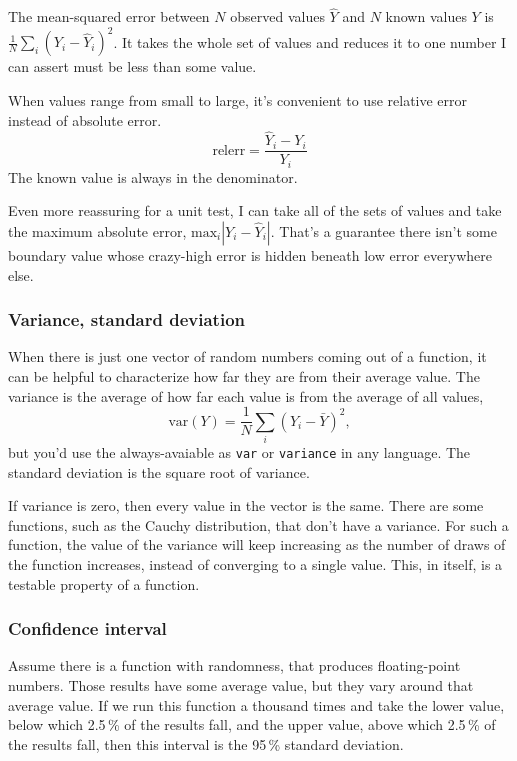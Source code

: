 \documentclass[fleqn,10pt]{olplainarticle}
\begin{document}
The mean-squared error between $N$ observed values $\hat{Y}$ and $N$ known values $Y$ is $\frac{1}{N}\sum_i (Y_i - \hat{Y}_i)^2$.
It takes the whole set of values and reduces it to one number I can assert must be less than some value.

When values range from small to large, it's convenient to use
relative error instead of absolute error.
\begin{equation}
  \mbox{relerr} = \frac{\hat{Y}_i - Y_i}{Y_i}
\end{equation}
The known value is always in the denominator.

Even more reassuring for a unit test, I can take all of the
sets of values and take the maximum absolute error,
$\mbox{max}_i |Y_i-\hat{Y}_i|$. That's a guarantee there isn't
some boundary value whose crazy-high error is hidden beneath
low error everywhere else.

\subsubsection{Variance, standard deviation}
When there is just one vector of random numbers coming out
of a function, it can be helpful to characterize how far
they are from their average value. The variance is
the average of how far each value is from the average of all
values,
\begin{equation}
  \mbox{var}(Y) = \frac{1}{N}\sum_i (Y_i - \bar{Y})^2,
\end{equation}
but you'd use the always-avaiable
as \lstinline!var! or \lstinline!variance! in any language.
The standard deviation is the square root of variance.

If variance is zero, then every value in the vector is
the same. There are some functions, such as the Cauchy
distribution, that don't have a variance. For such a function,
the value of the variance will keep increasing as the
number of draws of the function increases, instead of
converging to a single value. This, in itself, is a
testable property of a function.


\subsubsection{Confidence interval}

Assume there is a function with randomness, that produces floating-point numbers. Those results
have some average value, but they vary around that average value.
If we run this function a thousand times and take the
lower value, below which 2.5\,\% of the results fall,
and the upper value, above which 2.5\,\% of the results fall,
then this interval is the 95\,\% standard deviation.
\end{document}
